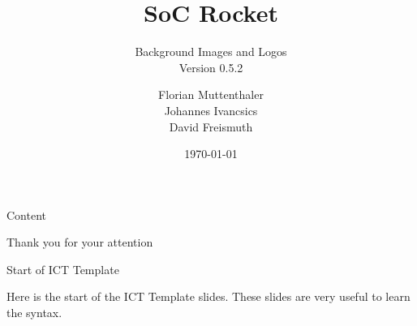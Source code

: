 \documentclass{beamer}
\title[SoC Rocket]{SoC Rocket}
\subtitle{Background Images and Logos\\
Version 0.5.2}
\author{Florian Muttenthaler\\Johannes Ivancsics\\David Freismuth}
\institute[TU Wien]{TU Wien, Vienna, Austria}
\date{\today}
\begin{document}
\begin{frame}
  \titlepage
\end{frame}      


%
%

\begin{frame}{Content}

\end{frame}





\begin{frame}{}
  \centering\Huge
  Thank you for your attention
\end{frame}

%
%
\begin{frame}{Start of ICT Template}
\begin{block}{}
Here is the start of the ICT Template slides. These slides are very useful to learn the syntax.	
\end{block}
\end{frame}


\end{document}
